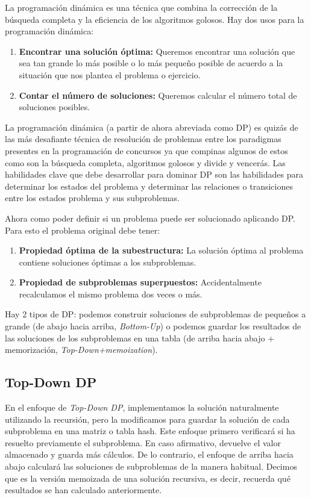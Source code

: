 La programación dinámica es una técnica que combina la corrección de la búsqueda completa y la eficiencia de los algoritmos golosos. Hay dos usos para la programación dinámica:

\begin{enumerate}
	\item \textbf{Encontrar una solución óptima:} Queremos encontrar una solución que sea tan grande lo más posible o lo más pequeño posible de acuerdo a la situación que nos plantea el problema o ejercicio.
	\item \textbf{Contar el número de soluciones:} Queremos calcular el número total de soluciones posibles.
\end{enumerate}

La programación dinámica (a partir de ahora abreviada como DP) es quizás de las más desafiante técnica de resolución de problemas entre los paradigmas presentes en la programación de concursos ya que compinas algunos de estos como son la búsqueda completa, algoritmos golosos y divide y vencerás. Las habilidades clave que debe desarrollar para dominar DP son las habilidades para determinar los estados del problema y determinar las relaciones o transiciones entre los estados problema y sus subproblemas.

Ahora como poder definir si un problema puede ser solucionado aplicando DP. Para esto el problema original debe tener:

\begin{enumerate}
	\item \textbf{Propiedad óptima de la subestructura:} La solución óptima al problema contiene soluciones óptimas a los subproblemas.
	\item \textbf{Propiedad de subproblemas superpuestos:} Accidentalmente recalculamos el mismo problema dos veces o más.
\end{enumerate}

Hay 2 tipos de DP: podemos construir soluciones de subproblemas de pequeños a
grande (de abajo hacia arriba, \emph{Bottom-Up}) o podemos guardar los resultados de las soluciones de los subproblemas en una tabla (de arriba hacia abajo
+ memorización, \emph{Top-Down+memoization}).

\subsection{Top-Down DP}

En el enfoque de \emph{Top-Down DP}, implementamos la solución naturalmente utilizando la recursión, pero la modificamos para guardar la solución de cada subproblema en una matriz o tabla hash. Este enfoque primero verificará si ha resuelto previamente el subproblema. En caso afirmativo, devuelve el valor almacenado y guarda más cálculos. De lo contrario, el enfoque de arriba hacia abajo calculará las soluciones de subproblemas de la manera habitual. Decimos que es la versión memoizada de una solución recursiva, es decir, recuerda qué resultados se han calculado anteriormente.


